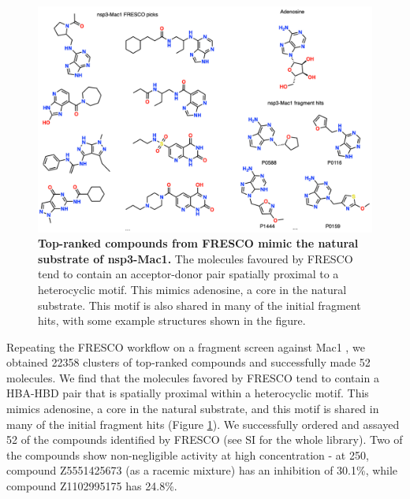 \begin{figure}[!b]
 \centering
 \includegraphics[width=0.8\linewidth]{Chapters/Fresco/Figs/mac1_ligands.png}
 \caption{\textbf{Top-ranked compounds from FRESCO mimic the natural substrate of nsp3-Mac1.} The molecules favoured by FRESCO tend to contain an acceptor-donor pair spatially proximal to a heterocyclic motif. This mimics adenosine, a core in the natural substrate. This motif is also shared in many of the initial fragment hits, with some example structures shown in the figure.}
 \label{fig:mac1_ligands}
\end{figure}

Repeating the FRESCO workflow on a fragment screen against Mac1 \cite{Schuller2021Mac1Frag}, we obtained 22358 clusters of top-ranked compounds and successfully made 52 molecules. We find that the molecules favored by FRESCO tend to contain a HBA-HBD pair that is spatially proximal within a heterocyclic motif. This mimics adenosine, a core in the natural substrate, and this motif is shared in many of the initial fragment hits (Figure \ref{fig:mac1_ligands}). We successfully ordered and assayed 52 of the compounds identified by FRESCO (see SI for the whole library). Two of the compounds show non-negligible activity at high concentration - at 250\uM, compound Z5551425673 (as a racemic mixture) has an inhibition of 30.1\%, while compound Z1102995175 has 24.8\%.

